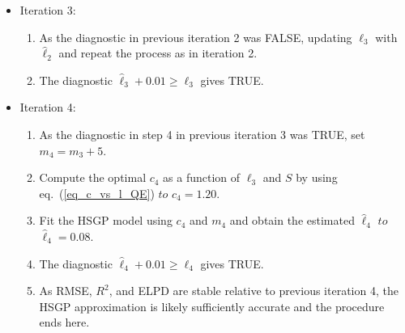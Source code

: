 \begin{itemize}
\item[] Iteration 3:
	\begin{enumerate}
	\item As the diagnostic in previous iteration 2 was FALSE, updating $\ell_3$ with $\hat{\ell}_2$ and repeat the process as in iteration 2.
	
	\item The diagnostic $\hat{\ell}_3 + 0.01 \geq \ell_3$ gives TRUE.
	\end{enumerate}
	
\item[] Iteration 4:
	\begin{enumerate}
	\item As the diagnostic in step 4 in previous iteration 3 was TRUE, set $m_4 = m_3 + 5$.
	
	\item Compute the optimal $c_4$ as a function of $\ell_3$ and $S$ by using eq.~(\ref{eq_c_vs_l_QE}) $to$ $c_4=1.20$.
	
	\item Fit the HSGP model using $c_4$ and $m_4$ and obtain the estimated $\hat{\ell}_4$ $to$ $\hat{\ell}_4=0.08$.
	
	\item The diagnostic $\hat{\ell}_4 + 0.01 \geq \ell_4$ gives TRUE.
	
	\item As RMSE, $R^2$, and ELPD are stable relative to previous iteration 4, the HSGP approximation is likely sufficiently accurate and the procedure ends here.
	\end{enumerate}
	
\end{itemize} 


